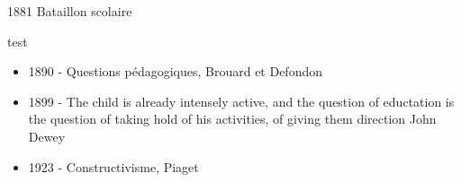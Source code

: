 \begin{frame}{1881 Bataillon scolaire}
\end{frame}

\begin{frame}{test}
  \begin{itemize}
  \item 1890 - Questions pédagogiques, Brouard et Defondon
  \item 1899 - \og{}The child is already intensely active, and the question 
  of eductation is the question of taking hold of his activities, of 
  giving them direction\fg{} John Dewey
  \item 1923 - Constructivisme, Piaget
  \end{itemize}
  
\end{frame}


